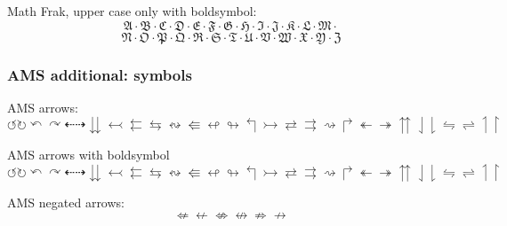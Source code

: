 \documentclass[12pt,a4paper]{article}
\theoremstyle{clearprint}
\begin{document}
\noindent
Math Frak, upper case only with boldsymbol:
\begin{equation}
\boldsymbol{\mathfrak{A} \cdot \mathfrak{B} \cdot \mathfrak{C} \cdot \mathfrak{D} \cdot \mathfrak{E} \cdot \mathfrak{F} \cdot \mathfrak{G} \cdot \mathfrak{H} \cdot \mathfrak{I} \cdot \mathfrak{J} \cdot \mathfrak{K} \cdot \mathfrak{L} \cdot \mathfrak{M} \cdot} 
\end{equation}
\begin{equation}
\boldsymbol{\mathfrak{N} \cdot \mathfrak{O} \cdot \mathfrak{P} \cdot \mathfrak{Q} \cdot \mathfrak{R} \cdot \mathfrak{S} \cdot \mathfrak{T} \cdot \mathfrak{U} \cdot \mathfrak{V} \cdot \mathfrak{W} \cdot \mathfrak{X} \cdot \mathfrak{Y} \cdot \mathfrak{Z}}
\end{equation}

\subsubsection[AMS symbols]{AMS additional: symbols}

\noindent 
AMS arrows: %
\begin{equation}
\circlearrowleft \circlearrowright \curvearrowleft \curvearrowright \dashleftarrow \dashrightarrow \downdownarrows \leftarrowtail \leftleftarrows \leftrightarrows \leftrightsquigarrow \Lleftarrow \looparrowleft \looparrowright \Lsh \rightarrowtail \rightleftarrows \rightrightarrows \rightsquigarrow \Rsh \twoheadleftarrow \twoheadrightarrow \upuparrows
\downharpoonleft \downharpoonright \leftrightharpoons \rightleftharpoons \upharpoonleft \upharpoonright
\end{equation}

AMS arrows with boldsymbol
\begin{equation}
\boldsymbol{\circlearrowleft \circlearrowright \curvearrowleft \curvearrowright \dashleftarrow \dashrightarrow \downdownarrows \leftarrowtail \leftleftarrows \leftrightarrows \leftrightsquigarrow \Lleftarrow \looparrowleft \looparrowright \Lsh \rightarrowtail \rightleftarrows \rightrightarrows \rightsquigarrow \Rsh \twoheadleftarrow \twoheadrightarrow \upuparrows
\downharpoonleft \downharpoonright \leftrightharpoons \rightleftharpoons \upharpoonleft \upharpoonright
}
\end{equation}

\noindent
AMS negated arrows: %
\begin{equation}
\nLeftarrow \nleftarrow \nLeftrightarrow \nleftrightarrow \nRightarrow \nrightarrow
\end{equation}
\end{document}
